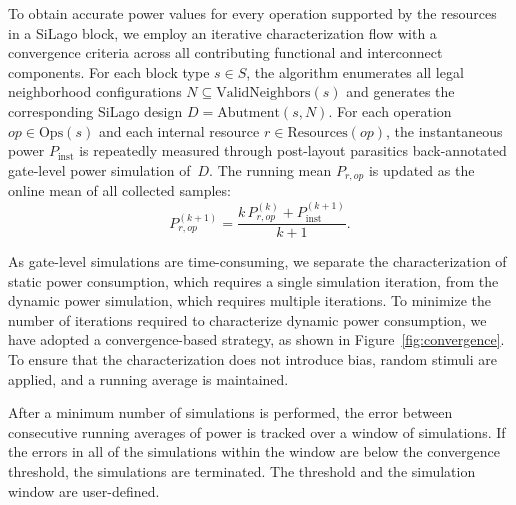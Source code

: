 To obtain accurate power values for every operation supported by the resources in a SiLago block, we employ an iterative characterization flow with a
convergence criteria across all contributing functional and interconnect components. 
For each block type $s \in S$, the algorithm enumerates all legal neighborhood configurations $N \subseteq \mathrm{ValidNeighbors}(s)$ and generates the corresponding SiLago design $D = \mathrm{Abutment}(s, N)$. 
For each operation $op \in \mathrm{Ops}(s)$ and each internal resource $r \in \mathrm{Resources}(op)$, the instantaneous power $P_{\mathrm{inst}}$ is repeatedly measured through post-layout parasitics back-annotated gate-level power simulation   of~$D$.
The running mean $P_{r,op}$ is updated as the online mean of all collected samples:
\begin{equation}
    P_{r,op}^{(k+1)}
    = \frac{k \, P_{r,op}^{(k)} + P_{\mathrm{inst}}^{(k+1)}}{k+1}.
\end{equation}


As gate-level simulations are time-consuming, we separate the characterization of static power consumption, which requires a single simulation iteration, from the dynamic power simulation, which requires multiple iterations. 
To minimize the number of iterations required to characterize dynamic power consumption, we have adopted a convergence-based strategy, as shown in Figure~\ref {fig:convergence}. 
To ensure that the characterization does not introduce bias, random stimuli are applied, and a running average is maintained. 

After a minimum number of simulations is performed, the error between consecutive running averages of power is tracked over a window of simulations. 
If the errors in all of the simulations within the window are below the convergence threshold, the simulations are terminated. 
The threshold and the simulation window are user-defined.

